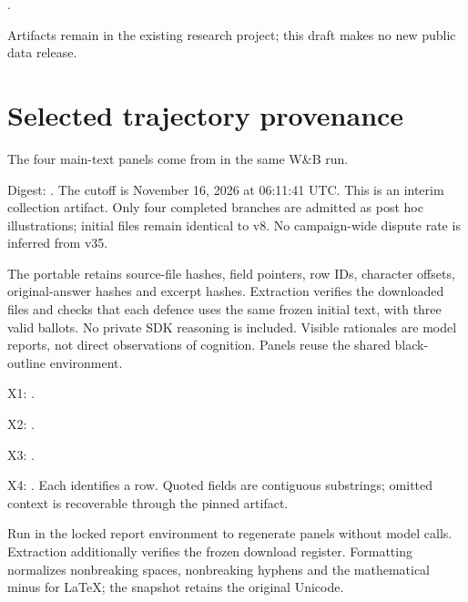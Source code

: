 .

Artifacts remain in the existing research project; this draft makes no new
public data release.

\section{Selected trajectory provenance}
\label{app:excerpt-provenance}
The four main-text panels come from
 in the same W\&B run.

Digest: .
The cutoff is November 16, 2026 at 06:11:41 UTC. This is an interim
collection artifact. Only four completed branches are admitted as post hoc
illustrations; initial files remain identical to v8. No campaign-wide
dispute rate is inferred from v35.

The portable  retains source-file
hashes, field pointers, row IDs, character offsets, original-answer hashes
and excerpt hashes. Extraction verifies the downloaded files and checks that
each defence uses the same frozen initial text, with three valid ballots.
No private SDK reasoning is included. Visible rationales are model reports,
not direct observations of cognition. Panels reuse the shared
 black-outline environment.

X1: .

X2: .

X3: .

X4: . Each identifies a
 row. Quoted fields are contiguous substrings; omitted
context is recoverable through the pinned artifact.

Run  in the locked report environment
to regenerate panels without model calls. Extraction additionally verifies
the frozen download register. Formatting normalizes nonbreaking spaces,
nonbreaking hyphens and the mathematical minus for LaTeX; the snapshot retains
the original Unicode.

